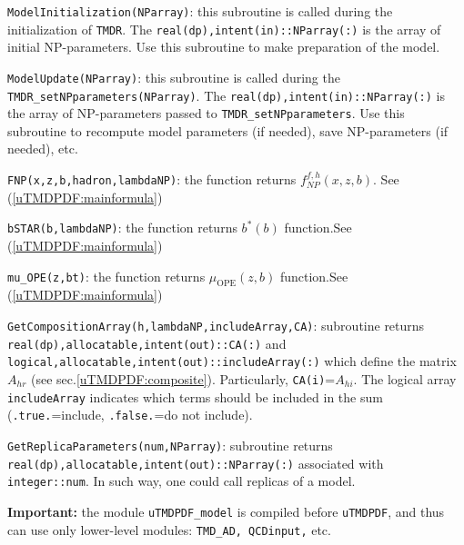 \documentclass[prd,nofootinbib,eqsecnum,final]{revtex4}
\renewcommand{\(}{\left(}
\renewcommand{\)}{\right)}
\renewcommand{\[}{\left[}
\renewcommand{\]}{\right]}
\begin{document}
\texttt{ModelInitialization(NParray)}: this subroutine is called during the initialization of \texttt{TMDR}. The \texttt{real(dp),intent(in)::NParray(:)} is the array of initial NP-parameters. Use this subroutine to make preparation of the model.

\vspace{2mm}

\texttt{ModelUpdate(NParray)}: this subroutine is called during the \texttt{TMDR\_setNPparameters(NParray)}. The \texttt{real(dp),intent(in)::NParray(:)} is the array of NP-parameters passed to \texttt{TMDR\_setNPparameters}. Use this subroutine to recompute model parameters (if needed), save NP-parameters (if needed), etc.

\vspace{2mm}

\texttt{FNP(x,z,b,hadron,lambdaNP)}: the function returns $f^{f,h}_{NP}(x,z,b)$. See (\ref{uTMDPDF:mainformula})

\vspace{2mm}

\texttt{bSTAR(b,lambdaNP)}: the function returns $b^*(b)$ function.See (\ref{uTMDPDF:mainformula})

\vspace{2mm}

\texttt{mu\_OPE(z,bt)}: the function returns $\mu_\text{OPE}(z,b)$ function.See (\ref{uTMDPDF:mainformula})

\vspace{2mm}

\texttt{GetCompositionArray(h,lambdaNP,includeArray,CA)}: subroutine returns \texttt{real(dp),allocatable,intent(out)::CA(:)} and \texttt{logical,allocatable,intent(out)::includeArray(:)} which define the matrix $A_{hr}$ (see sec.\ref{uTMDPDF:composite}). Particularly, \texttt{CA(i)}=$A_{hi}$. The logical array \texttt{includeArray} indicates which terms should be included in the sum (\texttt{.true.}=include, \texttt{.false.}=do not include).

\vspace{2mm}

\texttt{GetReplicaParameters(num,NParray)}: subroutine returns \texttt{real(dp),allocatable,intent(out)::NParray(:)} associated with \texttt{integer::num}. In such way, one could call replicas of a model.

\vspace{2mm}



\textbf{Important:} the module \texttt{uTMDPDF\_model} is compiled before \texttt{uTMDPDF}, and thus can use only lower-level modules: \texttt{TMD\_AD, QCDinput,} etc.
\end{document}
